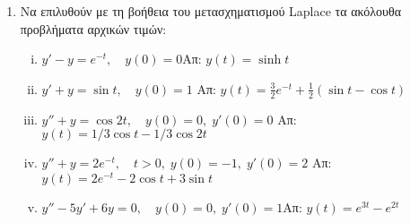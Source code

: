 \documentclass[a4paper,table]{report}
\begin{document}
\begin{center}
  \minibox{\large\bfseries \textcolor{Col1}{Ασκήσεις στο Μετασχηματισμό Laplace}}
\end{center}

\vspace{\baselineskip}

\begin{enumerate}

  \item Να επιλυθούν με τη βοήθεια του μετασχηματισμού Laplace τα ακόλουθα 
    προβλήματα αρχικών τιμών:
    \begin{enumerate}[i)]
      \item $y'-y=e^{-t},\quad y(0)=0$\hfill Απ: $y(t)=\sinh t$
      \item $y'+y=\sin t,\quad y(0)=1$
        \hfill Απ: $y(t)=\frac{3}{2}e^{-t}+\frac{1}{2}(\sin t-\cos t)$
      \item $y''+y =\cos 2t, \quad y(0)=0, \; y'(0)=0$ 
        \hfill Απ: $y(t)={1}/{3}\cos t-{1}/{3}\cos 2t$
      \item $y''+y=2e^{-t},\quad t>0, \; y(0)=-1, \; y'(0)=2$
        \hfill Απ: $y(t)=2e^{-t}-2\cos t+3\sin t$
      \item $y''-5y'+6y=0,\quad y(0)=0, \; y'(0)=1$\hfill Απ: $y(t)=e^{3t}-e^{2t}$
    \end{enumerate}


\end{enumerate}
\end{document}
